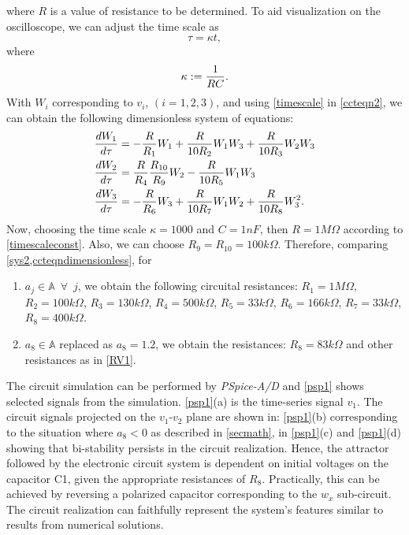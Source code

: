 \documentclass[final,5p,times,twocolumn]{elsarticle}
\begin{document}
where $R$ is a value of resistance to be determined. To aid visualization on the oscilloscope, we can adjust the time scale as
\begin{equation}
\tau = \kappa t\label{timescale},
\end{equation}
where
\begin{equation}
\kappa:= {1\over RC}\label{timescaleconst}.
\end{equation}
With $W_i$ corresponding to $v_i$, $(i=1,2,3)$, and using \eqref{timescale} in \eqref{ccteqn2}, we can obtain the following dimensionless system of equations:
\begin{equation}
\begin{split}
&{dW_1\over d\tau} = -{R\over R_1}W_1+{R\over 10R_2}W_1W_3+{R\over 10R_3}W_2W_3\\
&{dW_2\over d\tau} = {R\over R_4}{R_{10}\over R_9}W_2-{R\over 10R_5}W_1W_3\\
&{dW_3\over d\tau} = -{R\over R_6}W_3+{R\over 10R_7}W_1W_2+{R\over 10R_8}W_3^2.\label{ccteqndimensionless}
\end{split}
\end{equation}
Now, choosing the time scale $\kappa=1000$ and $C=1nF$, then $R = 1M\Omega$ according to \eqref{timescaleconst}. Also, we can choose $R_9=R_{10} = 100k\Omega$. Therefore, comparing \cref{sys2,ccteqndimensionless}, for
\begin{enumerate}
	\item $a_j\in\mathbb{A}\enspace\forall\enspace j$, we obtain the following circuital resistances: $R_1 = 1M\Omega$, $R_2 = 100k\Omega$, $R_3=130k\Omega$, $R_4=500k\Omega$, $R_5=33k\Omega$, $R_6=166k\Omega$, $R_7=33k\Omega$, $R_8 = 400k\Omega$\label{RV1}.	
	\item
	$a_8\in\mathbb{A}$ replaced as $a_8=1.2$, we obtain the resistances: $R_8 = 83k\Omega$ and other resistances as in \cref{RV1}\label{RV2}. 
\end{enumerate}
The circuit simulation can be performed by \textit{PSpice-A/D} and \cref{psp1} shows selected signals from the simulation. \cref{psp1}(a) is the time-series signal $v_1$. The circuit signals projected on the $v_1$-$v_2$ plane are shown in: \cref{psp1}(b) corresponding to the situation where $a_8<0$ as described in \cref{secmath}, in \cref{psp1}(c) and \cref{psp1}(d) showing that bi-stability persists in the circuit realization. Hence, the attractor followed by the electronic circuit system is dependent on initial voltages on the capacitor C1, given the appropriate resistances of $R_8$. Practically, this can be achieved by reversing a polarized capacitor corresponding to the $w_x$ sub-circuit. The circuit realization can faithfully represent the system's features similar to results from numerical solutions.
\end{document}
